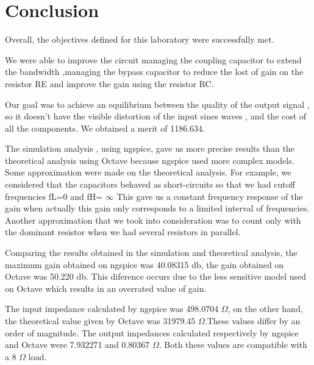 \section{Conclusion}
\label{sec:conclusion}


Overall, the objectives defined for this laboratory were successfully met.

We were able to improve the circuit managing the coupling capacitor to extend the bandwidth ,managing the bypass capacitor to reduce the lost of gain on the resistor RE and improve the gain using the resistor RC.


Our goal was to achieve an equilibrium between the quality of the output signal , so it doesn't have the visible distortion of the input sines waves , and the cost of all the components. We obtained a merit of 1186.634.

The simulation analysis , using ngspice, gave us more precise results than the theoretical analysis using Octave because ngspice used more complex models. Some approximation were made on the theoretical analysis. For example, we considered that the capacitors behaved as short-circuits so that we had  cutoff frequencies fL=0 and fH= $\infty$ This gave us a constant frequency response of the gain when actually this gain only corresponds to a limited interval of frequencies.  Another approximation that we took into consideration was to count only with the dominant resistor when we had several resistors in parallel.  

Comparing the results obtained in the simulation and theoretical analysis, the maximum gain obtained on ngspice was 40.08315 db, the gain obtained on Octave was 50.220 db. This diference occurs due to the less sensitive model used on Octave which results in an overrated value of gain. 

The input impedance calculated by ngspice was 498.0704 $\Omega$, on the other hand, the theoretical value  given by Octave was 31979.45 $\Omega$.These values differ by an order of magnitude. The output impedances calculated respectively by ngspice and Octave were 7.932271 and 0.80367 $\Omega$. Both these values are compatible with a 8 $\Omega$ load. 






